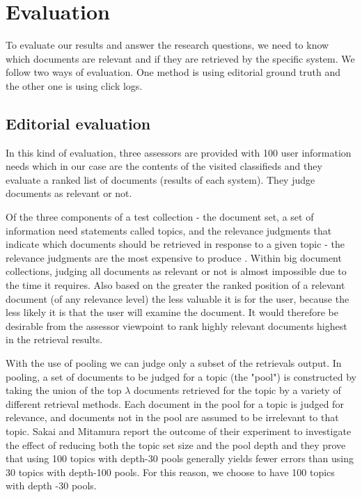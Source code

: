 \section{Evaluation}

To evaluate our results and answer the research questions, we need to know which documents are relevant and if they are retrieved by the specific system. We follow two ways of evaluation. One method is using editorial ground truth and the other one is using click logs.

\subsection{Editorial evaluation}

In this kind of evaluation, three assessors are provided with 100 user information needs which in our case are the contents of the visited classifieds and they evaluate a ranked list of documents (results of each system). They judge documents as relevant or not.

Of the three components of a test collection - the document set, a set of information need statements called topics, and the relevance judgments that indicate which documents should be retrieved in response to a given topic - the relevance judgments are the most expensive to produce \cite{BuckleyDimmick}. Within big document collections, judging all documents as relevant or not is  almost impossible due to the time it requires. Also based on \cite{KalervoKekalainen} the greater the ranked position of a relevant document (of any relevance level) the less valuable it is for the user, because the less likely it is that the user will examine the document. It would therefore be desirable from the assessor viewpoint to rank highly relevant documents highest in the retrieval results.

With the use of pooling we can judge only a subset of the retrievals output. In pooling, a set of documents to be judged for a topic (the "pool") is constructed by taking the union of the top $\lambda$ documents retrieved for the topic by a variety of different retrieval methods. Each document in the pool for a topic is judged for relevance, and documents not in the pool are assumed to be irrelevant to that topic.
Sakai and Mitamura \cite{SakaiMitamura} report the outcome of their experiment to investigate the effect of reducing both the topic set size and the pool depth and they prove that using 100 topics with depth-30 pools generally yields fewer errors than using 30 topics with depth-100 pools. For this reason, we choose to have 100 topics with depth -30 pools.


